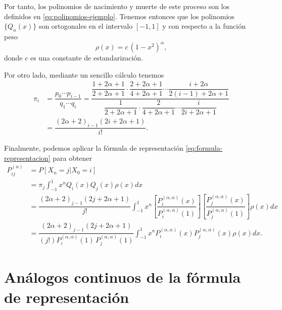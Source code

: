 \begin{ejemplo}
        Por tanto, los polinomios de nacimiento y muerte de este proceso son los definidos en \eqref{eq:polinomios-ejemplo}. Tenemos entonces que los polinomios $\{Q_n(x)\}$ son ortogonales en el intervalo $[-1,1]$ y con respecto a la función peso
        $$
        \rho(x) = c\, (1-x^2)^\alpha,
        $$
        donde $c$ es una constante de estandarización.

        Por otro lado, mediante un sencillo cálculo tenemos
        \begin{equation}
            \begin{split}
                \pi_i &=\dfrac{p_0\cdots p_{i-1}}{q_1\cdots q_i} = \dfrac{\dfrac{1+2\alpha+1}{2+2\alpha+1}\cdot\dfrac{2+2\alpha+1}{4+2\alpha+1}\cdots \dfrac{i+2\alpha}{2(i-1)+2\alpha+1}}{\dfrac{1}{2+2\alpha+1}\cdot\dfrac{2}{4+2\alpha+1}\cdots \dfrac{i}{2i+2\alpha+1}} \\
                &= \dfrac{(2\alpha+2)_{i-1}(2i+2\alpha+1)}{i!}.
            \end{split}
        \end{equation}

        Finalmente, podemos aplicar la fórmula de representación \eqref{eq:formula-representacion} para obtener
        \begin{equation*}
            \begin{split}
                P_{ij}^{(n)}& = P[X_n=j|X_0=i] \\
                &= \pi_j \int_{-1}^1 x^n Q_i(x)Q_j(x)\rho(x)dx \\
                &= \dfrac{(2\alpha+2)_{j-1}(2j+2\alpha+1)}{j!} \int_{-1}^1 x^n \left[\dfrac{P^{(\alpha,\alpha)}_i(x)}{P^{(\alpha,\alpha)}_i(1)}\right]\left[\dfrac{P^{(\alpha,\alpha)}_j(x)}{P^{(\alpha,\alpha)}_j(1)}\right]\rho(x) dx \\
                &= \dfrac{(2\alpha+2)_{j-1}(2j+2\alpha+1)}{(j!)P^{(\alpha,\alpha)}_i(1)\, P^{(\alpha,\alpha)}_j(1)} \int_{-1}^1 x^n P^{(\alpha,\alpha)}_i(x) P^{(\alpha,\alpha)}_j(x)\rho(x) dx.
            \end{split}
        \end{equation*} 

    \end{ejemplo}

    \section{Análogos continuos de la fórmula de representación}
    \label{sec:analogos-continuos}

